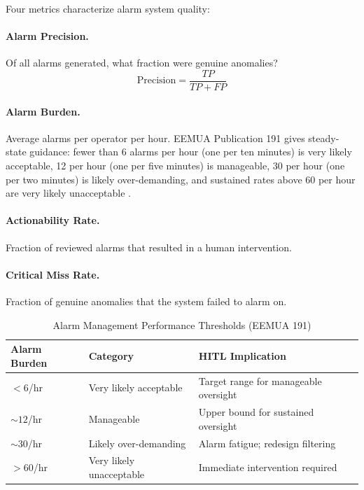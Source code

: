 Four metrics characterize alarm system quality:

\paragraph{Alarm Precision.} Of all alarms generated, what fraction were genuine anomalies?
\begin{equation}
\text{Precision} = \frac{TP}{TP + FP}
\label{eq:alarm-precision}
\end{equation}

\paragraph{Alarm Burden.} Average alarms per operator per hour. EEMUA Publication 191 gives steady-state guidance: fewer than 6 alarms per hour (one per ten minutes) is very likely acceptable, 12 per hour (one per five minutes) is manageable, 30 per hour (one per two minutes) is likely over-demanding, and sustained rates above 60 per hour are very likely unacceptable \autocite{eemua191}.

\paragraph{Actionability Rate.} Fraction of reviewed alarms that resulted in a human intervention.

\paragraph{Critical Miss Rate.} Fraction of genuine anomalies that the system failed to alarm on.

\begin{table}[h]
\centering
\caption{Alarm Management Performance Thresholds (EEMUA 191)}
\label{tab:alarm-thresholds}
\begin{tabularx}{\textwidth}{@{}lYY@{}}
\toprule
\textbf{Alarm Burden} & \textbf{Category} & \textbf{HITL Implication} \\
\midrule
$< 6$/hr & Very likely acceptable & Target range for manageable oversight \\
$\sim 12$/hr & Manageable & Upper bound for sustained oversight \\
$\sim 30$/hr & Likely over-demanding & Alarm fatigue; redesign filtering \\
$> 60$/hr & Very likely unacceptable & Immediate intervention required \\
\bottomrule
\end{tabularx}
\end{table}


